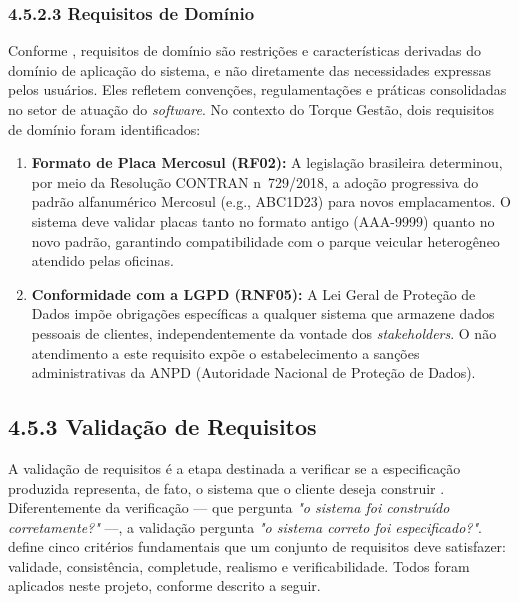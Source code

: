 \documentclass[12pt, a4paper]{article}
\begin{document}
\subsubsection{4.5.2.3 Requisitos de Domínio}
\label{subsubsec:dominio}

Conforme , requisitos de domínio são restrições e
características derivadas do domínio de aplicação do sistema, e não
diretamente das necessidades expressas pelos usuários. Eles refletem
convenções, regulamentações e práticas consolidadas no setor de atuação do
\textit{software}. No contexto do Torque Gestão, dois requisitos de domínio
foram identificados:

\begin{enumerate}
    \item \textbf{Formato de Placa Mercosul (RF02):} A legislação brasileira
    determinou, por meio da Resolução CONTRAN n\textordmasculine~729/2018, a
    adoção progressiva do padrão alfanumérico Mercosul (e.g., ABC1D23) para
    novos emplacamentos. O sistema deve validar placas tanto no formato
    antigo (AAA-9999) quanto no novo padrão, garantindo compatibilidade com
    o parque veicular heterogêneo atendido pelas oficinas.

    \item \textbf{Conformidade com a LGPD (RNF05):} A Lei Geral de Proteção
    de Dados impõe obrigações específicas a qualquer sistema que armazene
    dados pessoais de clientes, independentemente da vontade dos
    \textit{stakeholders}. O não atendimento a este requisito expõe o
    estabelecimento a sanções administrativas da ANPD (Autoridade Nacional
    de Proteção de Dados).
\end{enumerate}

\subsection{4.5.3 Validação de Requisitos}
\label{subsec:validacao}

A validação de requisitos é a etapa destinada a verificar se a especificação
produzida representa, de fato, o sistema que o cliente deseja construir
\cite{sommerville2011}. Diferentemente da verificação — que pergunta
\textit{"o sistema foi construído corretamente?"} —, a validação pergunta
\textit{"o sistema correto foi especificado?"}. 
define cinco critérios fundamentais que um conjunto de requisitos deve
satisfazer: validade, consistência, completude, realismo e verificabilidade.
Todos foram aplicados neste projeto, conforme descrito a seguir.
\end{document}
